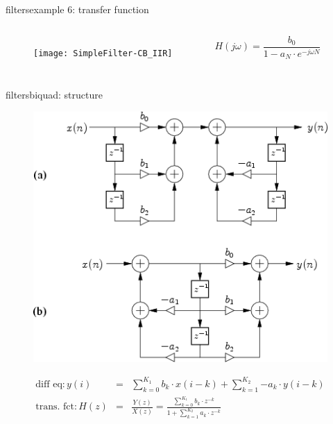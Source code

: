 	\begin{frame}{filters}{example 6: transfer function}
        \vspace{-10mm}
        \begin{columns}
		\begin{figure}
			\centerline{\texttt{[image: SimpleFilter-CB\_IIR]}}
		\end{figure}
    	\begin{equation*}
    		H(j\omega) = \frac{b_0}{1-a_N\cdot e^{-j\omega N}}
    	\end{equation*}
        \end{columns}
	\end{frame}
	\begin{frame}{filters}{biquad: structure}
        \vspace{-3mm}
		\begin{figure}
			\centerline{\includegraphics[scale=.3]{graph/general_biquad_jos}}
		    \label{fig:general_biquad}
		\end{figure}
		\pause
		\vspace{-3mm}
		\begin{eqnarray*}
			\text{diff eq}: y(i) 	&=& \sum_{k=0}^{K_1}{b_k\cdot x(i-k)} + \sum_{k=1}^{K_2}{-a_k\cdot y(i-k)} \nonumber\\
			\text{trans. fct}: H(z) 	&=& \frac{Y(z)}{X(z)} =  \frac{\sum_{k=0}^{K_1}{b_k\cdot z^{-k}}}{1 + \sum_{k=1}^{K_2}{a_k\cdot z^{-k}}} 
		\end{eqnarray*}
	\end{frame}


